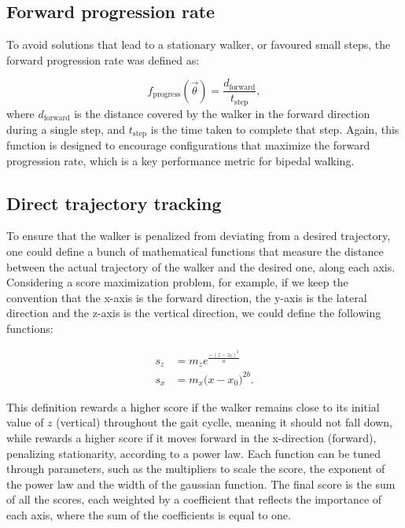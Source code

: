 \subsection{Forward progression rate}
To avoid solutions that lead to a stationary walker, or favoured small steps, the forward progression rate was defined as:

\begin{equation}\label{eq:opt_forward_progression}
    f_{\text{progress}}(\vec{\theta}) = \frac{d_{\text{forward}}}{t_{\text{step}}},
\end{equation}
where $d_{\text{forward}}$ is the distance covered by the walker in the forward direction during a single step, and $t_{\text{step}}$ is the time taken to complete that step.
Again, this function is designed to encourage configurations that maximize the forward progression rate, which is a key performance metric for bipedal walking.

\subsection{Direct trajectory tracking}
To ensure that the walker is penalized from deviating from a desired trajectory, one could define a bunch of mathematical functions that measure the distance between the actual trajectory of the walker and the desired one, along each axis.
Considering a score maximization problem, for example, if we keep the convention that the x-axis is the forward direction, the y-axis is the lateral direction and the z-axis is the vertical direction, we could define the following functions:

\begin{equation}
    \begin{split}
        s_z &= m_z e^{\frac{-(z - z_0)^2}{a}}\\
        s_x &= m_x \big( x - x_0 \big)^{2b}.
    \end{split}
\end{equation}

This definition rewards a higher score if the walker remains close to its initial value of $z$ (vertical) throughout the gait cyclle, meaning it should not fall down, while rewards a higher score if it moves forward in the x-direction (forward), penalizing stationarity, according to a power law.
Each function can be tuned through parameters, such as the multipliers to scale the score, the exponent of the power law and the width of the gaussian function.
The final score is the sum of all the scores, each weighted by a coefficient that reflects the importance of each axis, where the sum of the coefficients is equal to one.

